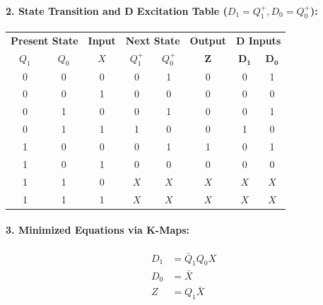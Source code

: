 \documentclass[11pt,a4paper,oneside]{book}
\begin{document}
\paragraph{2. State Transition and D Excitation Table ($D_1 = Q_1^+, D_0 = Q_0^+$):}
\begin{center}
\begin{tabular}{|cc|c|cc|c|cc|}
\hline
\multicolumn{2}{|c|}{\textbf{Present State}} & \textbf{Input} & \multicolumn{2}{c|}{\textbf{Next State}} & \textbf{Output} & \multicolumn{2}{c|}{\textbf{D Inputs}} \\
$Q_1$ & $Q_0$ & $X$ & $Q_1^+$ & $Q_0^+$ & $\mathbf{Z}$ & $\mathbf{D_1}$ & $\mathbf{D_0}$ \\ \hline
0 & 0 & 0 & 0 & 1 & 0 & 0 & 1 \\ \hline
0 & 0 & 1 & 0 & 0 & 0 & 0 & 0 \\ \hline
0 & 1 & 0 & 0 & 1 & 0 & 0 & 1 \\ \hline
0 & 1 & 1 & 1 & 0 & 0 & 1 & 0 \\ \hline
1 & 0 & 0 & 0 & 1 & 1 & 0 & 1 \\ \hline
1 & 0 & 1 & 0 & 0 & 0 & 0 & 0 \\ \hline
1 & 1 & 0 & $X$ & $X$ & $X$ & $X$ & $X$ \\ \hline
1 & 1 & 1 & $X$ & $X$ & $X$ & $X$ & $X$ \\ \hline
\end{tabular}
\end{center}

\paragraph{3. Minimized Equations via K-Maps:}
\begin{align*}
D_1 &= \bar{Q}_1 Q_0 X \\
D_0 &= \bar{X} \\
Z &= Q_1 \bar{X}
\end{align*}
\end{document}

